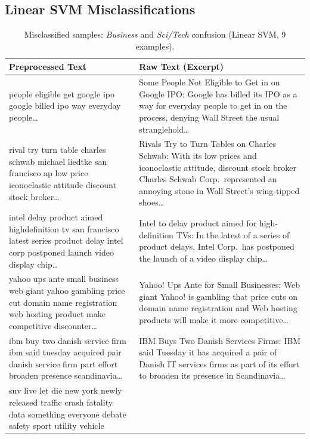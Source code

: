 \subsection*{Linear SVM Misclassifications}

\begin{table}[htbp]
\centering
\caption{Misclassified samples: \textit{Business} and \textit{Sci/Tech} confusion (Linear SVM, 9 examples).}
\label{tab:linsvm-biz-scitech}
\small
\begin{tabular}{p{0.6\textheight} p{0.6\textheight}}
\toprule
\textbf{Preprocessed Text} & \textbf{Raw Text (Excerpt)} \\
\midrule
people eligible get google ipo google billed ipo way everyday people\ldots &
Some People Not Eligible to Get in on Google IPO: Google has billed its IPO as a way for everyday people to get in on the process, denying Wall Street the usual stranglehold\ldots \\
\addlinespace
rival try turn table charles schwab michael liedtke san francisco ap low price iconoclastic attitude discount stock broker\ldots &
Rivals Try to Turn Tables on Charles Schwab: With its low prices and iconoclastic attitude, discount stock broker Charles Schwab Corp.\ represented an annoying stone in Wall Street's wing-tipped shoes\ldots \\
\addlinespace
intel delay product aimed highdefinition tv san francisco latest series product delay intel corp postponed launch video display chip\ldots &
Intel to delay product aimed for high-definition TVs: In the latest of a series of product delays, Intel Corp.\ has postponed the launch of a video display chip\ldots \\
\addlinespace
yahoo ups ante small business web giant yahoo gambling price cut domain name registration web hosting product make competitive discounter\ldots &
Yahoo! Ups Ante for Small Businesses: Web giant Yahoo! is gambling that price cuts on domain name registration and Web hosting products will make it more competitive\ldots \\
\addlinespace
ibm buy two danish service firm ibm said tuesday acquired pair danish service firm part effort broaden presence scandinavia\ldots &
IBM Buys Two Danish Services Firms: IBM said Tuesday it has acquired a pair of Danish IT services firms as part of its effort to broaden its presence in Scandinavia\ldots \\
\addlinespace
suv live let die new york newly released traffic crash fatality data something everyone debate safety sport utility vehicle &

\end{tabular}
\end{table}
